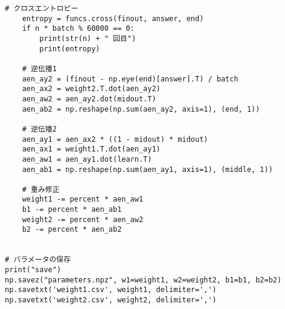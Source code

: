 \documentclass{ujarticle}
\begin{document}
\begin{lstlisting}[basicstyle=\ttfamily\footnotesize, frame=single]
    # クロスエントロピー
    entropy = funcs.cross(finout, answer, end)
    if n * batch % 60000 == 0:
        print(str(n) + " 回目")
        print(entropy)

    # 逆伝播1
    aen_ay2 = (finout - np.eye(end)[answer].T) / batch
    aen_ax2 = weight2.T.dot(aen_ay2)
    aen_aw2 = aen_ay2.dot(midout.T)
    aen_ab2 = np.reshape(np.sum(aen_ay2, axis=1), (end, 1))

    # 逆伝播2
    aen_ay1 = aen_ax2 * ((1 - midout) * midout)
    aen_ax1 = weight1.T.dot(aen_ay1)
    aen_aw1 = aen_ay1.dot(learn.T)
    aen_ab1 = np.reshape(np.sum(aen_ay1, axis=1), (middle, 1))

    # 重み修正
    weight1 -= percent * aen_aw1
    b1 -= percent * aen_ab1
    weight2 -= percent * aen_aw2
    b2 -= percent * aen_ab2


# パラメータの保存
print("save")
np.savez("parameters.npz", w1=weight1, w2=weight2, b1=b1, b2=b2)
np.savetxt('weight1.csv', weight1, delimiter=',')
np.savetxt('weight2.csv', weight2, delimiter=',')
\end{lstlisting}
\end{document}
